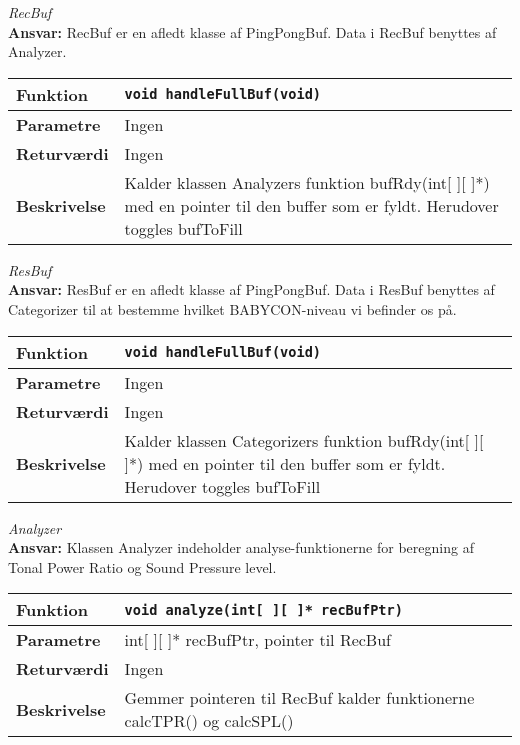 \textit{RecBuf} \\
\textbf{Ansvar:} RecBuf er en afledt klasse af PingPongBuf. Data i RecBuf benyttes af Analyzer.

\begin{center}
    \begin{tabular}{ | l | p{} |}
    \hline
    \textbf{Funktion}	& \verb+void handleFullBuf(void) +						\\ \hline
    \textbf{Parametre} 	& Ingen		\\ \hline
    \textbf{Returværdi}	& Ingen 								\\ \hline
    \textbf{Beskrivelse}& Kalder klassen Analyzers funktion bufRdy(int[ ][ ]*) med en pointer til den buffer som er fyldt. Herudover toggles bufToFill		\\ \hline
    \end{tabular}
\end{center} 


\textit{ResBuf} \\
\textbf{Ansvar:} ResBuf er en afledt klasse af PingPongBuf. Data i ResBuf benyttes af Categorizer til at bestemme hvilket BABYCON-niveau vi befinder os på. 

\begin{center}
    \begin{tabular}{ | l | p{} |}
    \hline
    \textbf{Funktion}	& \verb+void handleFullBuf(void) +						\\ \hline
    \textbf{Parametre} 	& Ingen		\\ \hline
    \textbf{Returværdi}	& Ingen 								\\ \hline
    \textbf{Beskrivelse}& Kalder klassen Categorizers funktion bufRdy(int[ ][ ]*) med en pointer til den buffer som er fyldt. Herudover toggles bufToFill		\\ \hline
    \end{tabular}
\end{center} 


\textit{Analyzer} \\
\textbf{Ansvar:} Klassen Analyzer indeholder analyse-funktionerne for beregning af Tonal Power Ratio og Sound Pressure level. 

\begin{center}
    \begin{tabular}{ | l | p{} |}
    \hline
    \textbf{Funktion}	& \verb+void analyze(int[ ][ ]* recBufPtr) +						\\ \hline
    \textbf{Parametre} 	& int[ ][ ]* recBufPtr, pointer til RecBuf		\\ \hline
    \textbf{Returværdi}	& Ingen 								\\ \hline
    \textbf{Beskrivelse}& Gemmer pointeren til RecBuf kalder funktionerne calcTPR() og calcSPL()		\\ \hline
    \end{tabular}
\end{center} 

